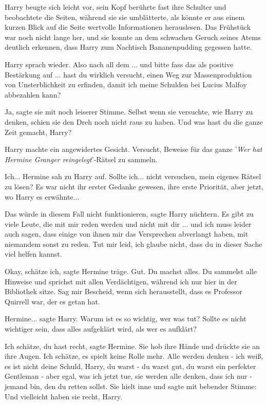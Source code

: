 Harry beugte sich leicht vor, sein Kopf berührte fast ihre Schulter und
beobachtete die Seiten, während sie sie umblätterte, als könnte er aus einem
kurzen Blick auf die Seite wertvolle Informationen herauslesen. Das Frühstück
war noch nicht lange her, und sie konnte an dem schwachen Geruch seines Atems
deutlich erkennen, dass Harry zum Nachtisch Bananenpudding gegessen hatte.

Harry sprach wieder. \glqq{}Also nach all dem ... und bitte fass das als positive
Bestärkung auf ... hast du wirklich versucht, einen Weg zur Massenproduktion von
Unsterblichkeit zu erfinden, damit ich meine Schulden bei Lucius Malfoy
abbezahlen kann?\grqq{}

\glqq{}Ja\grqq{}, sagte sie mit noch leiserer Stimme. Selbst wenn sie versuchte,
wie Harry zu denken, schien sie den Dreh noch nicht raus zu haben. \glqq{}Und was
hast du die ganze Zeit gemacht, Harry?\grqq{}

Harry machte ein angewidertes Gesicht. \glqq{}Versucht, Beweise für das ganze
'\emph{Wer hat Hermine Granger reingelegt}'-Rätsel zu sammeln.\grqq{}

\glqq{}Ich...\grqq{} Hermine sah zu Harry auf. \glqq{}Sollte ich... nicht
versuchen, mein eigenes Rätsel zu lösen?\grqq{} Es war nicht ihr erster Gedanke
gewesen, ihre erste Priorität, aber jetzt, wo Harry es erwähnte...

\glqq{}Das würde in diesem Fall nicht funktionieren\grqq{}, sagte Harry nüchtern.
\glqq{}Es gibt zu viele Leute, die mit mir reden werden und nicht mit dir ... und
ich muss leider auch sagen, dass einige von ihnen mir das Versprechen abverlangt
haben, mit niemandem sonst zu reden. Tut mir leid, ich glaube nicht, dass du in
dieser Sache viel helfen kannst.\grqq{}

\glqq{}Okay, schätze ich\grqq{}, sagte Hermine träge. \glqq{}Gut. Du machst alles.
Du sammelst alle Hinweise und sprichst mit allen Verdächtigen, während ich nur
hier in der Bibliothek sitze. Sag mir Bescheid, wenn sich herausstellt, dass es
Professor Quirrell war, der es getan hat.\grqq{}

\glqq{}Hermine...\grqq{} sagte Harry. \glqq{}Warum ist es so wichtig, wer was tut?
Sollte es nicht wichtiger sein, dass alles aufgeklärt wird, als wer es
aufklärt?\grqq{}

\glqq{}Ich schätze, du hast recht\grqq{}, sagte Hermine. Sie hob ihre Hände und
drückte sie an ihre Augen. \glqq{}Ich schätze, es spielt keine Rolle mehr. Alle
werden denken - ich weiß, es ist nicht deine Schuld, Harry, du warst - du warst
gut, du warst ein perfekter Gentleman - aber egal, was ich jetzt tue, sie werden
alle denken, dass ich nur - jemand bin, den du retten sollst.\grqq{} Sie hielt
inne und sagte mit bebender Stimme: \glqq{}Und vielleicht haben sie recht,
Harry.\grqq{}

